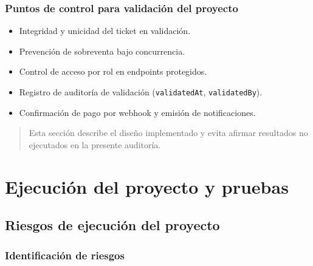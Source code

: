 \documentclass[
  11pt,
  a4paper,
  twoside=false,
  parskip=half               %
]{scrreprt}                  %
\providecommand{\tightlist}{%
  \setlength{\itemsep}{0pt}\setlength{\parskip}{0pt}}
\begin{document}
\hypertarget{puntos-de-control-para-validaciuxf3n-del-proyecto}{%
\subsection{Puntos de control para validación del
proyecto}\label{puntos-de-control-para-validaciuxf3n-del-proyecto}}

\begin{itemize}
\tightlist
\item
  Integridad y unicidad del ticket en validación.
\item
  Prevención de sobreventa bajo concurrencia.
\item
  Control de acceso por rol en endpoints protegidos.
\item
  Registro de auditoría de validación (\texttt{validatedAt},
  \texttt{validatedBy}).
\item
  Confirmación de pago por webhook y emisión de notificaciones.
\end{itemize}

\begin{quote}
Esta sección describe el diseño implementado y evita afirmar resultados
no ejecutados en la presente auditoría.
\end{quote}

\hypertarget{ejecuciuxf3n-del-proyecto-y-pruebas}{%
\chapter{Ejecución del proyecto y
pruebas}\label{ejecuciuxf3n-del-proyecto-y-pruebas}}

\hypertarget{riesgos-de-ejecuciuxf3n-del-proyecto}{%
\section{Riesgos de ejecución del
proyecto}\label{riesgos-de-ejecuciuxf3n-del-proyecto}}

\hypertarget{identificaciuxf3n-de-riesgos}{%
\subsection{Identificación de
riesgos}\label{identificaciuxf3n-de-riesgos}}
\end{document}
